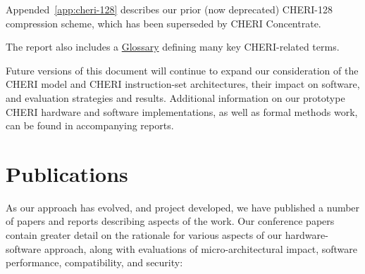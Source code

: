 \medskip
\noindent
Appended~\ref{app:cheri-128} describes our prior (now deprecated) CHERI-128
compression scheme, which has been superseded by CHERI Concentrate.

\medskip
\noindent
The report also includes a \hyperref[glossary]{Glossary} defining many key
CHERI-related terms.

\medskip

Future versions of this document will continue to expand our
consideration of the CHERI model and CHERI instruction-set architectures,
their impact on software, and evaluation strategies and results.
Additional information on our prototype CHERI hardware and software
implementations, as well as formal methods work, can be found in accompanying
reports.

\section{Publications}
\label{sec:publications}

As our approach has evolved, and project developed, we have published a number
of papers and reports describing aspects of the work.
Our conference papers contain greater detail on the rationale for various
aspects of our hardware-software approach, along with evaluations of
micro-architectural impact, software performance, compatibility, and security:

